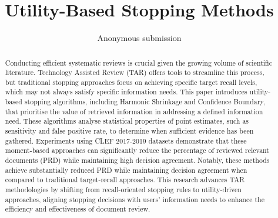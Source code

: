 \documentclass[sigconf,natbib=true,anonymous=true]{acmart}
\begin{document}
\title{Utility-Based Stopping Methods}




\author{Anonymous submission}


\begin{abstract}
  Conducting efficient systematic reviews is crucial given the growing volume of scientific literature. Technology Assisted Review (TAR) offers tools to streamline this process, but traditional stopping approaches focus on achieving specific target recall levels, which may not always satisfy specific information needs. This paper introduces utility-based stopping algorithms, including Harmonic Shrinkage and Confidence Boundary, that prioritise the value of retrieved information in addressing a defined information need. These algorithms analyse statistical properties of point estimates, such as sensitivity and false positive rate, to determine when sufficient evidence has been gathered. Experiments using CLEF 2017-2019 datasets demonstrate that these moment-based approaches can significantly reduce the percentage of reviewed relevant documents (PRD) while maintaining high decision agreement. Notably, these methods achieve substantially reduced PRD while maintaining decision agreement when compared to traditional target-recall approaches. This research advances TAR methodologies by shifting from recall-oriented stopping rules to utility-driven approaches, aligning stopping decisions with users' information needs to enhance the efficiency and effectiveness of document review.
\end{abstract}
\end{document}
